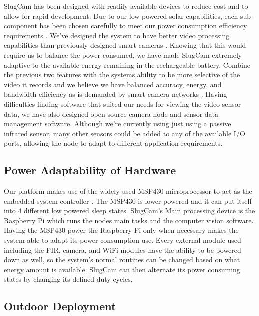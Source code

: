 \documentclass[10pt,conference]{IEEEtran}
\begin{document}
SlugCam has been designed with readily available devices  to reduce cost and to allow for rapid development. Due to our low powered solar capabilities, each sub-component has been chosen carefully to meet our power consumption efficiency requirements . We've designed the system to have better video processing capabilities than previously designed smart cameras \cite{SWEETcam}. Knowing that this would require us to balance the power consumed, we have made SlugCam extremely adaptive to the available energy remaining in the rechargeable battery. Combine the previous two features with the systems ability to be more selective of the video it records and we believe we have balanced accuracy, energy, and bandwidth efficiency as is demanded by smart camera networks \cite{AccLatEnergy}. Having difficulties finding software that suited our needs for viewing the video sensor data, we have also designed open-source camera node and sensor data management software. Although we're currently using just using a passive infrared sensor, many other sensors could be added to any of the available I/O ports, allowing the node to adapt to different application requirements. 
	
    \subsection{Power Adaptability of Hardware}

Our platform makes use of the widely used MSP430 microprocessor to act as the embedded system controller \cite{msp430}. The MSP430 is lower powered and it can put itself into 4 different low powered sleep states. SlugCam's Main processing device is the Raspberry Pi \cite{raspberrypi} which runs the nodes main tasks and the computer vision software. Having the MSP430 power the Raspberry Pi only when necessary makes the system able to adapt its power consumption use. Every external module used including the PIR, camera, and WiFi modules have the ability to be powered down as well, so the system's normal routines can be changed based on what energy amount is available. SlugCam can then alternate its power consuming states by changing its defined duty cycles. 

	\subsection{Outdoor Deployment}
\end{document}
